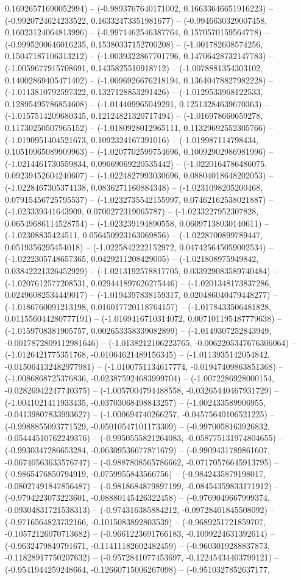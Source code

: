 0.16926571690052994) -- (-0.9893767640171002, 0.16633646651916223) -- (-0.9920724624233522, 0.16332473351981677) -- (-0.9946630329007458, 0.16023124064813996) -- (-0.9971462546387764, 0.1570570159564778) -- (-0.9995200646016235, 0.15380337152700208) -- (-1.001782608574256, 0.15047187106313212) -- (-1.0039322867701796, 0.14706428732147783) -- (-1.0059677915708691, 0.1435825510918712) -- (-1.0078881354303102, 0.14002869405471402) -- (-1.0096926676218194, 0.13640478827982228) -- (-1.0113810792597322, 0.1327128853291426) -- (-1.0129533968122533, 0.12895495786854608) -- (-1.014409965049291, 0.12513284639670363) -- (-1.0157514209680345, 0.12124821320717494) -- (-1.016978660659278, 0.11730250507965152) -- (-1.0180928012965111, 0.11329692552305766) -- (-1.0190951404521673, 0.1092324167391016) -- (-1.019987114798434, 0.10510965089909963) -- (-1.0207702599754696, 0.10092902986981996) -- (-1.0214461730559834, 0.09669069220535442) -- (-1.0220164786486075, 0.09239452604240607) -- (-1.0224827993030696, 0.08804018648202053) -- (-1.0228467305374138, 0.0836271160884348) -- (-1.0231098205200468, 0.07915456725795537) -- (-1.0232735542155997, 0.07462162538021887) -- (-1.023339341643909, 0.0700272319065787) -- (-1.0233227952307828, 0.06549686114528754) -- (-1.023239194890558, 0.06097138030140611) -- (-1.02308835424511, 0.056450923163069856) -- (-1.0228700899789447, 0.0519356295454018) -- (-1.0225842222152972, 0.047425645059002534) -- (-1.0222305748657365, 0.0429211208429005) -- (-1.021808975949842, 0.03842221326452929) -- (-1.0213192578817705, 0.033929083589740484) -- (-1.0207612577208531, 0.029441897626275446) -- (-1.0201348173837286, 0.02496082534449017) -- (-1.0194397838159317, 0.020486040479448277) -- (-1.0186760091213198, 0.016017720118764157) -- (-1.0178433506481828, 0.011556044280777191) -- (-1.0169416710314072, 0.007101195487779638) -- (-1.0159708381905757, 0.002653358339082899) -- (-1.0149307252843949, -0.0017872809112981646) -- (-1.0138212106223765, -0.0062205347676306064) -- (-1.0126421775351768, -0.01064621489156345) -- (-1.0113935142054842, -0.015064132482977981) -- (-1.0100751134617774, -0.01947409863851368) -- (-1.0086868725376836, -0.023875924683999704) -- (-1.0072286928000154, -0.02826942247740375) -- (-1.0057004794488558, -0.03265440467931729) -- (-1.0041021411933435, -0.03703068498843257) -- (-1.002433589906955, -0.04139807833993627) -- (-1.000694740266257, -0.04575640106521225) -- (-0.9988855093771529, -0.05010547101173309) -- (-0.9970058163926832, -0.05444510762249376) -- (-0.9950555821264083, -0.058775131974804655) -- (-0.9930347286653284, -0.06309536677871679) -- (-0.9909431789861607, -0.06740563633576747) -- (-0.9887808565786662, -0.07170576645913795) -- (-0.9865476850794919, -0.0759955843566756) -- (-0.9842435879198017, -0.08027491847856487) -- (-0.9818684879897199, -0.08454359833171912) -- (-0.9794223073223601, -0.08880145426322458) -- (-0.9769049667999374, -0.09304831721538313) -- (-0.974316385884212, -0.09728401845508092) -- (-0.9716564823732166, -0.1015083892803539) -- (-0.9689251721859707, -0.10572126070713682) -- (-0.9661223691766183, -0.1099224631392614) -- (-0.9632479849791671, -0.11411182602482459) -- (-0.9603019288837873, -0.11828917750207632) -- (-0.9572841077453697, -0.12245434403799121) -- (-0.9541944259248664, -0.12660715006267098) -- (-0.9510327852637177, 